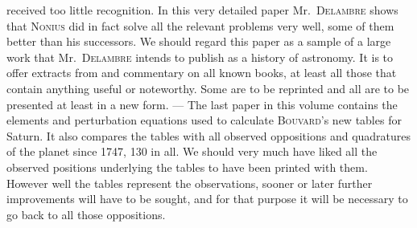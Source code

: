 received too little recognition. In this very detailed paper Mr.\ \textsc{Delambre} shows that \textsc{Nonius} did in fact solve all the relevant problems very well, some of them better than his successors. We should regard this paper as a sample of a large work that Mr.\ \textsc{Delambre} intends to publish as a history of astronomy. It is to offer extracts from and commentary on all known books, at least all those that contain anything useful or noteworthy. Some are to be reprinted and all are to be presented at least in a new form. --- The last paper in this volume contains the elements and perturbation equations used to calculate \textsc{Bouvard}’s new tables for Saturn. It also compares the tables with all observed oppositions and quadratures of the planet since 1747, 130 in all. We should very much have liked all the observed positions underlying the tables to have been printed with them. However well the tables represent the observations, sooner or later further improvements will have to be sought, and for that purpose it will be necessary to go back to all those oppositions.
